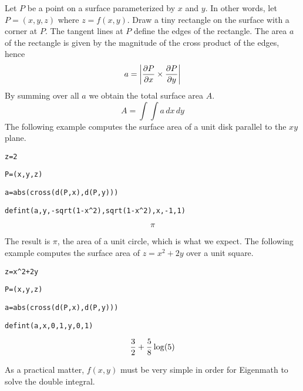 
\noindent
Let $P$ be a point on a surface parameterized by $x$ and $y$.
In other words, let $P=(x,y,z)$ where $z=f(x,y)$.
Draw a tiny rectangle on the surface with a corner at $P$.
The tangent lines at $P$ define the edges of the rectangle.
The area $a$ of the rectangle is given by the magnitude
of the cross product of the edges, hence
$$a=\left|{\partial P\over\partial x}\times{\partial P\over\partial y}\right|$$
By summing over all $a$ we obtain the total surface area $A$.
$$A=\int\!\!\!\int a\,dx\,dy$$
The following example computes the surface area of a unit disk
parallel to the $xy$ plane.

\medskip
\verb$z=2$

\verb$P=(x,y,z)$

\verb$a=abs(cross(d(P,x),d(P,y)))$

\verb$defint(a,y,-sqrt(1-x^2),sqrt(1-x^2),x,-1,1)$

$$\pi$$

\medskip
\noindent
The result is $\pi$, the area of a unit circle, which is what we expect.
The following example computes the surface area of $z=x^2+2y$ over
a unit square.

\medskip
\verb$z=x^2+2y$

\verb$P=(x,y,z)$

\verb$a=abs(cross(d(P,x),d(P,y)))$

\verb$defint(a,x,0,1,y,0,1)$

$${3\over2}+{5\over8}\log(5)$$

\medskip
\noindent
As a practical matter, $f(x,y)$ must be very simple in order
for Eigenmath to solve the double integral.

